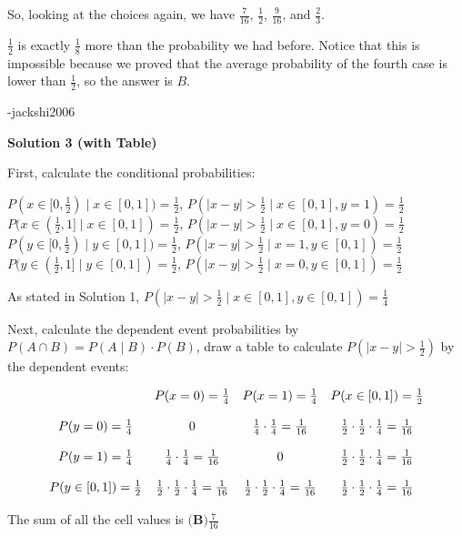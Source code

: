 \begin{enumerate}
 So, looking at the choices again, we have $\frac{7}{16}$, $\frac{1}{2}$, $\frac{9}{16}$, and $\frac{2}{3}$. 

 $\frac{1}{2}$ is exactly $\frac{1}{8}$ more than the probability we had before. Notice that this is impossible because we proved that the average probability of the fourth case is lower than $\frac{1}{2}$, so the answer is $\boxed{B}$.

 -jackshi2006

 



\textbf{Solution 3 (with Table)}

First, calculate the conditional probabilities:

 $P(x\in[0,\frac{1}{2}) \mid x\in[0,1]) = \frac{1}{2}$,  $P(|x-y|>\frac{1}{2} \mid x\in[0,1], y=1) = \frac{1}{2}$
$P(x\in(\frac{1}{2},1] \mid x\in[0,1]) = \frac{1}{2}$,  $P(|x-y|>\frac{1}{2} \mid x\in[0,1], y=0) = \frac{1}{2}$
$P(y\in[0,\frac{1}{2}) \mid y\in[0,1]) = \frac{1}{2}$,  $P(|x-y|>\frac{1}{2} \mid x=1, y\in[0,1]) = \frac{1}{2}$
$P(y\in(\frac{1}{2},1] \mid y\in[0,1]) = \frac{1}{2}$,  $P(|x-y|>\frac{1}{2} \mid x=0, y\in[0,1]) = \frac{1}{2}$

 As stated in Solution 1, $P(|x-y|>\frac{1}{2} \mid x\in[0,1], y\in[0,1]) = \frac{1}{4}$

 Next, calculate the dependent event probabilities by $P(A \cap B)= P(A \mid B) \cdot P(B)$, draw a table to calculate $P(|x-y|>\frac{1}{2})$ by the dependent events:

 
 \[ \begin{array}[b]{cccc}  & P(x=0)=\frac{1}{4} & P(x=1)=\frac{1}{4} & P(x \in [0,1])=\frac{1}{2} \\  &  &  &  \\ P(y=0)=\frac{1}{4} & 0 & \frac{1}{4} \cdot \frac{1}{4} = \frac{1}{16} & \frac{1}{2} \cdot \frac{1}{2} \cdot \frac{1}{4} = \frac{1}{16} \\  &  &  &  \\ P(y=1)=\frac{1}{4} & \frac{1}{4} \cdot \frac{1}{4} = \frac{1}{16} & 0 & \frac{1}{2} \cdot \frac{1}{2} \cdot \frac{1}{4} = \frac{1}{16} \\  &  &  &  \\ P(y \in [0,1])=\frac{1}{2} & \frac{1}{2} \cdot \frac{1}{2} \cdot \frac{1}{4} = \frac{1}{16} & \frac{1}{2} \cdot \frac{1}{2} \cdot \frac{1}{4} = \frac{1}{16} & \frac{1}{2} \cdot \frac{1}{2} \cdot \frac{1}{4} = \frac{1}{16}  \end{array} \]

 The sum of all the cell values is $\boxed{\textbf{(B)}\frac{7}{16}}$





\end{enumerate}
